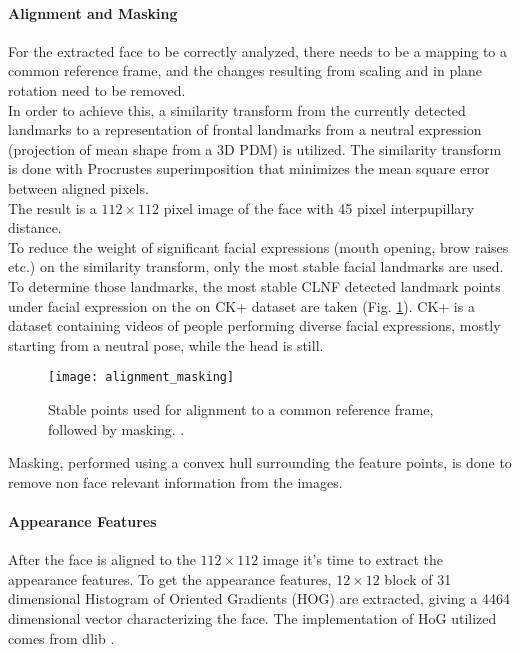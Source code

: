 \paragraph{Alignment and Masking}
For the extracted face to be correctly analyzed, there needs to be a mapping to a common reference frame, and the changes resulting from scaling and in plane rotation need to be removed. \\
In order to achieve this, a similarity transform from the currently detected landmarks to a representation of frontal landmarks from a neutral expression (projection of mean shape from a 3D PDM) is utilized. The similarity transform is done with Procrustes superimposition that minimizes the mean square error between aligned pixels.\\
The result is a $112 \times 112$ pixel image of the face with 45 pixel interpupillary distance. \\
To reduce the weight of significant facial expressions (mouth opening, brow raises etc.) on the similarity transform, only the most stable facial landmarks are used. \\
To determine those landmarks, the most stable CLNF detected landmark points under facial expression on the on CK+ dataset \cite{CK+} are taken (Fig. \ref{fig:alignment_masking}). CK+ is a dataset containing videos of people performing diverse facial expressions, mostly starting from a neutral pose, while the head is still.

\begin{figure}[H]
	\centering
	\texttt{[image: alignment\_masking]}
	\caption{Stable points used for alignment to a common reference frame, followed by masking. \cite{Baltru2015}.}
	\label{fig:alignment_masking}
\end{figure}

Masking, performed using a convex hull surrounding the feature points, is done to remove non face relevant information from the images.

\paragraph{Appearance Features}
After the face is aligned to the $112 \times 112$ image it's time to extract the appearance features. To get the appearance features, $12 \times 12$ block of 31 dimensional Histogram of Oriented Gradients (HOG) are extracted, giving a 4464 dimensional vector characterizing the face. The implementation of HoG utilized comes from dlib \cite{dlib}.


